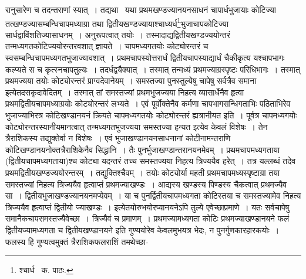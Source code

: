 \documentclass[11pt, openany]{book}
\begin{document}
\noindent रानुसारेण च तदन्तराणां स्यात्~। तद्यथा \textendash\ यथा प्रथमखण्डज्यानयनसाधनं चापार्धभुजायाः कोटिज्या तत्खण्डज्यासम्बन्धिचापमध्याग्रा तथा द्वितीयखण्डज्यायाश्चाध्यर्ध\renewcommand{\thefootnote}{१}\footnote{श्चार्ध \textendash\ क. पाठः.}भुजाचापकोटिज्या सार्धद्वाविंशतिज्यासाधनम्~। अनुरूपत्वात् तयोः~। तस्मादाद्यद्वितीयखण्डज्ययोन्तरं तन्मध्यगतकोटिज्ययोरन्तरवशात् ज्ञायते~। चापमध्यगतयोः कोट्योरन्तरं च स्वसम्बन्धिचापमध्यगतभुजाज्यावशात्~। प्रथमचापस्योत्तरार्धं द्वितीयचापस्याद्यार्धं चैकीकृत्य यश्चापभागः कल्प्यते स च कृत्स्नचापतुल्यः~। तदर्धद्वयैक्यात्~। तस्मात् तन्मध्यं प्रथमज्याग्रस्पृष्टः परिधिभागः~। तस्मात् प्रथमज्यया तयोः कोट्योरन्तरं प्राग्वदेवानेयम्~। समस्तज्या पुनस्तुल्येषु चापेषु सर्वत्रैव समाना इत्येतदसकृदावेदितम्~। तस्मात् तां समस्तज्यां प्रथमभुजज्यया निहत्य व्यासार्धेनैव हृत्वा प्रथमद्वितीयचापमध्याग्रयोः कोट्योरन्तरं लभ्यते~। एवं पूर्वोक्तेनैव कर्मणा चापभागसन्धिगताभिः पठिताभिरेव भुजाज्याभिरत्र कोटिखण्डानयनं क्रियते चापमध्यगतयोः कोट्योरन्तरं ह्यत्रानीयत इति~। पूर्वत्र चापमध्यगयोः कोट्योरन्तरस्यानीयमानत्वात् तन्मध्यगतभुजज्यया समस्तज्या हन्यत इत्येव केवलं विशेषः~। तेन त्रैराशिकस्य तद्युक्तेर्वा न 
विशेषः~। एवं भुजाखण्डानयनसाधनानां कोटीनामन्तराणि कोटिखण्डानयनोक्तत्रैराशिकेनैव सिद्धानि~। तैः पुनर्भुजाखण्डान्तरानयनमेवम्~।
प्रथमचापमध्यगताया (द्वितीयचापमध्यगताया)श्च कोट्या यदन्तरं तच्च समस्तज्यया निहत्य त्रिज्ययैव हरेत्~। तत्र यल्लब्धं तदेव प्रथमद्वितीयखण्डज्ययोरन्तरम्~। तद्युक्तिश्चैवम्~। तयोः कोट्योर्या महती प्रथमचापमध्यस्पृष्टाग्रा तया समस्तज्यां निहत्य त्रिज्ययैव हृत्वाप्तं प्रथमज्याखण्डः~। आद्यस्य खण्डस्य पिण्डस्य चैकत्वात् प्रथमज्यैव सा~। द्वितीयभुजाखण्डज्यानयनमप्येवम्~। या च पुनर्द्वितीयचापमध्यगता कोटिस्तया च समस्तज्यामेव निहत्य त्रिज्ययैव हृत्वाप्तं द्वितीयो ज्याखण्डः~। इत्येतयोरुभयोरप्यानयनेऽपि तुल्ये एवेच्छाप्रमाणे~। यतः सर्वचापेषु समानैकचापसमस्तज्यैवेच्छा~। त्रिज्यैवं च प्रमाणम्~। प्रथमज्यामध्यगता कोटिः प्रथमज्याखण्डानयने फलं द्वितीयज्यामध्यगता च द्वितीयखण्डानयने इति गुण्ययोरेव केवलमुभयत्र भेदः, न पुनर्गुणकारहारकयोः~। फलस्य हि गुण्यत्वमुक्तं {\qt त्रैराशिकफलराशिं तमथेच्छा-}

\newpage
\end{document}
